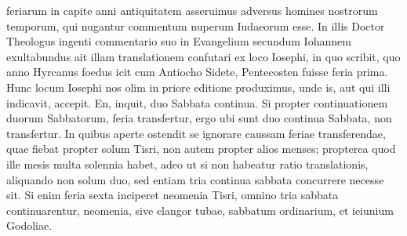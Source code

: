 feriarum in capite anni antiquitatem asseruimus adversus homines
nostrorum temporum, qui nugantur commentum nuperum
Iudaeorum esse.
In illis Doctor Theologus ingenti commentario
suo in Evangelium secundum Iohannem exultabundus ait illam
translationem confutari ex loco Iosephi, in quo scribit, quo anno
Hyrcanus foedus icit cum Antiocho Sidete, Pentecosten fuisse feria
prima.
Hunc locum Iosephi nos olim in priore editione produximus,
unde is, aut qui illi indicavit, accepit.
En, inquit, duo Sabbata continua.
Si propter continuationem duorum Sabbatorum, feria transfertur,
ergo ubi sunt duo continua Sabbata, non transfertur. 
In quibus
aperte ostendit se ignorare caussam feriae transferendae, quae fiebat
propter solum Tisri, non autem propter alios menses; propterea
quod ille mesis multa solennia habet, adeo ut si non habeatur
ratio translationis, aliquando non solum duo, sed entiam tria continua
sabbata concurrere necesse sit.
Si enim feria sexta inciperet
neomenia Tisri, omnino tria sabbata continuarentur, neomenia,
sive clangor tubae, sabbatum ordinarium, et ieiunium Godoliae.

